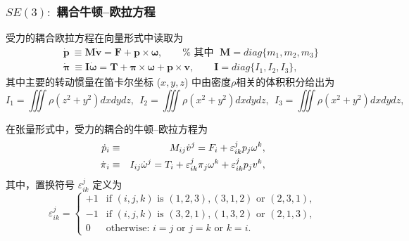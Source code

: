 \documentclass[11pt,fontset=founder]{ctexart}
\begin{document}
\subsubsection{$SE(3):$ 耦合牛顿–欧拉方程}

受力的耦合欧拉方程在向量形式中读取为
\begin{eqnarray*}
&&\boldsymbol{\dot{\mathbf{p}}}~ \mathbf{\equiv M}\boldsymbol{\dot{\mathbf{v}}}\mathbf{=F+p\times \omega },\qquad \text{%
其中}~~\,\mathbf{M}=diag\{m_{1},m_{2},m_{3}\} \\
&&\boldsymbol{\dot{\pi}}~ \mathbf{\equiv I}\boldsymbol{\dot{\omega}}\mathbf{=T+\pi \times \omega
+p\times v},\qquad \mathbf{I}=diag\{I_{1},I_{2},I_{3}\},
\end{eqnarray*}
其中主要的转动惯量在笛卡尔坐标 ($x,y,z$) 中由密度$\rho$相关的体积积分给出为
\begin{equation*}
I_{1}=\iiint \rho (z^{2}+y^{2})dxdydz, ~~ I_{2}=\iiint \rho
(x^{2}+y^{2})dxdydz, ~~ I_{3}=\iiint \rho (x^{2}+y^{2})dxdydz,
\end{equation*}

在张量形式中，受力的耦合的牛顿–欧拉方程为
\begin{eqnarray*}
\dot{p}_{i} &\equiv &M_{ij}\dot{v}^{j}=F_{i}+\varepsilon _{ik}^{j}p_{j}{%
\omega }^{k}, \\
\dot{\pi}_{i} &\equiv &I_{ij}\dot{\omega}^{j}=T_{i}+\varepsilon _{ik}^{j}\pi
_{j}\omega ^{k}+\varepsilon _{ik}^{j}p_{j}v^{k},
\end{eqnarray*}
其中，置换符号 $\varepsilon _{ik}^{j}$ 定义为
\begin{equation*}
\varepsilon _{ik}^{j}=
\begin{cases}
+1 & \text{if }(i,j,k)\text{ is }(1,2,3),(3,1,2)\text{ or }(2,3,1), \\
-1 & \text{if }(i,j,k)\text{ is }(3,2,1),(1,3,2)\text{ or }(2,1,3), \\
0 & \text{otherwise: }i=j\text{ or }j=k\text{ or }k=i.%
\end{cases}%
\end{equation*}
\end{document}
